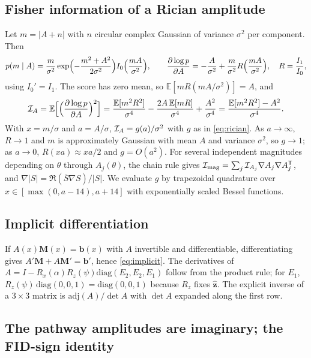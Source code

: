 \subsection{Fisher information of a Rician amplitude}\label{app:rician}

Let $m=|A+n|$ with $n$ circular complex Gaussian of variance $\sigma^2$ per component. Then
\[
  p(m\mid A)=\frac{m}{\sigma^2}\exp\Bigl(-\frac{m^2+A^2}{2\sigma^2}\Bigr)I_0\Bigl(\frac{mA}{\sigma^2}\Bigr),\qquad
  \frac{\partial\log p}{\partial A}=-\frac{A}{\sigma^2}+\frac{m}{\sigma^2}R\Bigl(\frac{mA}{\sigma^2}\Bigr),\quad R=\frac{I_1}{I_0},
\]
using $I_0'=I_1$. The score has zero mean, so $\mathbb E[mR(mA/\sigma^2)]=A$, and
\[
  \mathcal{I}_A=\mathbb E\Bigl[\Bigl(\frac{\partial\log p}{\partial A}\Bigr)^2\Bigr]
  =\frac{\mathbb E[m^2R^2]}{\sigma^4}-\frac{2A\,\mathbb E[mR]}{\sigma^4}+\frac{A^2}{\sigma^4}
  =\frac{\mathbb E[m^2R^2]-A^2}{\sigma^4}.
\]
With $x=m/\sigma$ and $a=A/\sigma$, $\mathcal{I}_A=g(a)/\sigma^2$ with $g$ as in \eqref{eq:rician}. As $a\to\infty$,
$R\to1$ and $m$ is approximately Gaussian with mean $A$ and variance $\sigma^2$, so $g\to1$; as $a\to0$,
$R(xa)\approx xa/2$ and $g=O(a^2)$. For several independent magnitudes depending on $\theta$ through
$A_j(\theta)$, the chain rule gives $\mathcal{I}_{\rm mag}=\sum_j\mathcal{I}_{A_j}\nabla A_j\nabla A_j^{\mathsf T}$, and
$\nabla|S|=\Re(\overline S\nabla S)/|S|$. We evaluate $g$ by trapezoidal quadrature over
$x\in[\max(0,a-14),a+14]$ with exponentially scaled Bessel functions.

\subsection{Implicit differentiation}\label{app:implicit}

If $A(x)\mathbf M(x)=\mathbf b(x)$ with $A$ invertible and differentiable, differentiating gives
$A'\mathbf M+A\mathbf M'=\mathbf b'$, hence \eqref{eq:implicit}. The derivatives of $A=I-R_x(\alpha)R_z(\psi)
\mathrm{diag}(E_2,E_2,E_1)$ follow from the product rule; for $E_1$, $R_z(\psi)\,\mathrm{diag}(0,0,1)=
\mathrm{diag}(0,0,1)$ because $R_z$ fixes $\hat{\mathbf z}$. The explicit inverse of a $3\times3$ matrix is
$\mathrm{adj}(A)/\det A$ with $\det A$ expanded along the first row.

\subsection{The pathway amplitudes are imaginary; the FID-sign identity}

